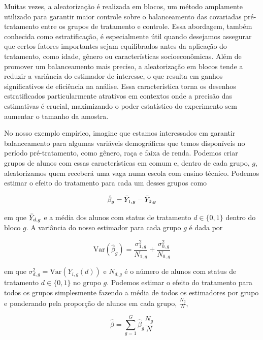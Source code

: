 Muitas vezes, a aleatorização é realizada em blocos, um método amplamente utilizado para garantir maior controle sobre o balanceamento das covariadas pré-tratamento entre os grupos de tratamento e controle. Essa abordagem, também conhecida como estratificação, é especialmente útil quando desejamos assegurar que certos fatores importantes sejam equilibrados antes da aplicação do tratamento, como idade, gênero ou características socioeconômicas. Além de promover um balanceamento mais preciso, a aleatorização em blocos tende a reduzir a variância do estimador de interesse, o que resulta em ganhos significativos de eficiência na análise. Essa característica torna os desenhos estratificados particularmente atrativos em contextos onde a precisão das estimativas é crucial, maximizando o poder estatístico do experimento sem aumentar o tamanho da amostra.

No nosso exemplo empírico, imagine que estamos interessados em garantir balanceamento para algumas variáveis demográficas que temos disponíveis no período pré-tratamento, como gênero, raça e faixa de renda. Podemos criar grupos de alunos com essas características em comum e, dentro de cada grupo, $g$, aleatorizamos quem receberá uma vaga numa escola com ensino técnico. Podemos estimar o efeito do tratamento para cada um desses grupos como 

\begin{equation}
    \hat{\beta}_g = \Bar{Y}_{1,g} - \Bar{Y}_{0,g}
\end{equation}

\noindent em que $\Bar{Y}_{d,g}$ e a média dos alunos com status de tratamento $d \in \{0,1\}$ dentro do bloco $g$. A variância do nosso estimador para cada grupo $g$ é dada por

\begin{equation}\label{varg}
    \mathrm{Var}(\hat{\beta}_g) = \frac{\sigma^2_{1,g}}{N_{1,g}} + \frac{\sigma^2_{0,g}}{N_{0,g}}
\end{equation}

\noindent em que $\sigma^2_{d,g} = \mathrm{Var}(Y_{i,g}(d))$ e $N_{d,g}$ é o número de alunos com status de tratamento $d \in \{0,1\}$ no grupo $g$. Podemos estimar o efeito do tratamento para todos os grupos simplesmente fazendo a média de todos os estimadores por grupo e ponderando pela proporção de alunos em cada grupo, $\frac{N_g}{N}$,

\begin{equation}
    \hat{\beta} = \sum_{g=1}^G \hat{\beta}_g \frac{N_g}{N}
\end{equation}

